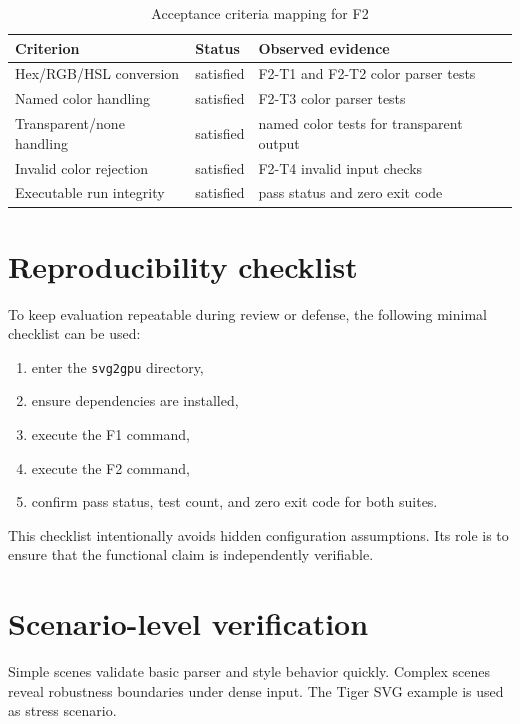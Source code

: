 \begin{table}[htbp]
\centering
\caption{Acceptance criteria mapping for F2}
\label{tab:f2_acceptance_mapping}
\begin{tabular}{>{\raggedright\arraybackslash}p{3.8cm} >{\raggedright\arraybackslash}p{3.0cm} >{\raggedright\arraybackslash}p{5.8cm}}
\toprule
\textbf{Criterion} & \textbf{Status} & \textbf{Observed evidence} \\
\midrule
Hex/RGB/HSL conversion & satisfied & F2-T1 and F2-T2 color parser tests \\
Named color handling & satisfied & F2-T3 color parser tests \\
Transparent/none handling & satisfied & named color tests for transparent output \\
Invalid color rejection & satisfied & F2-T4 invalid input checks \\
Executable run integrity & satisfied & pass status and zero exit code \\
\bottomrule
\end{tabular}
\end{table}

\section{Reproducibility checklist}

To keep evaluation repeatable during review or defense, the following minimal checklist can be used:

\begin{enumerate}
\item enter the \texttt{svg2gpu} directory,
\item ensure dependencies are installed,
\item execute the F1 command,
\item execute the F2 command,
\item confirm pass status, test count, and zero exit code for both suites.
\end{enumerate}

This checklist intentionally avoids hidden configuration assumptions.
Its role is to ensure that the functional claim is independently verifiable.

\section{Scenario-level verification}

Simple scenes validate basic parser and style behavior quickly.
Complex scenes reveal robustness boundaries under dense input.
The Tiger SVG example is used as stress scenario.

